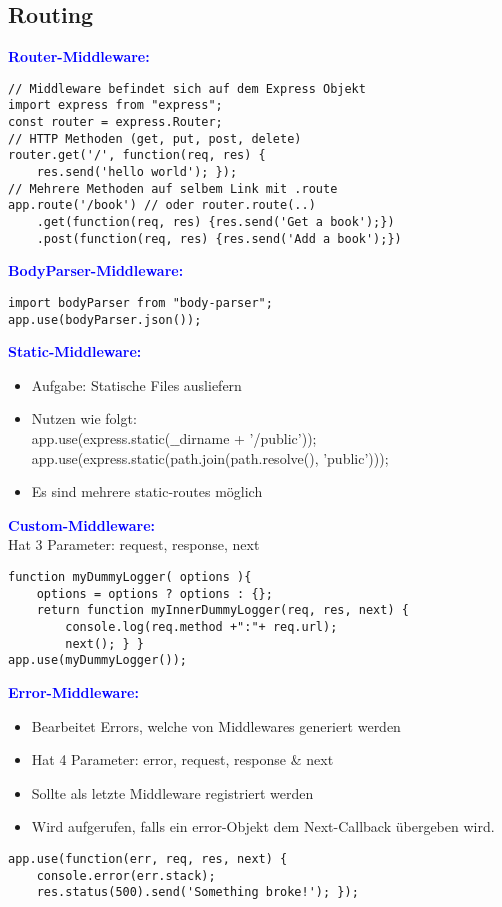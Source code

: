 \subsection{Routing}
\textbf{\textcolor{blue}{Router-Middleware:}}
\begin{lstlisting}[style=htmlcssjs]
// Middleware befindet sich auf dem Express Objekt
import express from "express";
const router = express.Router;
// HTTP Methoden (get, put, post, delete)
router.get('/', function(req, res) {
    res.send('hello world'); });
// Mehrere Methoden auf selbem Link mit .route
app.route('/book') // oder router.route(..)
    .get(function(req, res) {res.send('Get a book');})
    .post(function(req, res) {res.send('Add a book');})
\end{lstlisting}
\textbf{\textcolor{blue}{BodyParser-Middleware:}}
\begin{lstlisting}[style=htmlcssjs]
import bodyParser from "body-parser";
app.use(bodyParser.json());
\end{lstlisting}
\textbf{\textcolor{blue}{Static-Middleware:}}
\begin{itemize}[topsep=0pt, leftmargin=3mm]
    \setlength\itemsep{-0.3em}
    \item Aufgabe: Statische Files ausliefern
    \item Nutzen wie folgt:\\
    app.use(express.static($\_$$\_$dirname + '/public'));\\
    app.use(express.static(path.join(path.resolve(), 'public')));
    \item Es sind mehrere static-routes möglich
\end{itemize}
\textbf{\textcolor{blue}{Custom-Middleware:}}\\
Hat 3 Parameter: request, response, next
\begin{lstlisting}[style=htmlcssjs]
function myDummyLogger( options ){
    options = options ? options : {};
    return function myInnerDummyLogger(req, res, next) {
        console.log(req.method +":"+ req.url);
        next(); } }
app.use(myDummyLogger());
\end{lstlisting}
\textbf{\textcolor{blue}{Error-Middleware:}}
\begin{itemize}[topsep=0pt, leftmargin=3mm]
    \setlength\itemsep{-0.3em}
    \item Bearbeitet Errors, welche von Middlewares generiert werden
    \item Hat 4 Parameter: error, request, response \& next
    \item Sollte als letzte Middleware registriert werden
    \item Wird aufgerufen, falls ein error-Objekt dem Next-Callback übergeben wird.
\end{itemize}
\begin{lstlisting}[style=htmlcssjs]
app.use(function(err, req, res, next) {
    console.error(err.stack);
    res.status(500).send('Something broke!'); });
\end{lstlisting}
